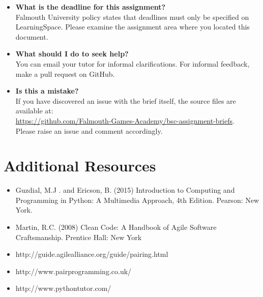 \documentclass{../fal_assignment}
\begin{document}
\begin{itemize}
	\item 	\textbf{What is the deadline for this assignment?} \\ 
    		Falmouth University policy states that deadlines must only be specified on LearningSpace. Please examine the assignment area where you located this document.
    		
	\item 	\textbf{What should I do to seek help?} \\ 
    		You can email your tutor for informal clarifications. For informal feedback, make a pull request on GitHub. 
    		
    	\item 	\textbf{Is this a mistake?} \\ 	
    		If you have discovered an issue with the brief itself, the source files are available at: \\
    		\url{https://github.com/Falmouth-Games-Academy/bsc-assignment-briefs}.\\
    		 Please raise an issue and comment accordingly.
\end{itemize}

\section*{Additional Resources}

\begin{itemize}
    \item Guzdial, M.J . and Ericson, B. (2015) Introduction to Computing and Programming in Python: A Multimedia Approach, 4th Edition. Pearson: New York.
    \item Martin, R.C. (2008) Clean Code: A Handbook of Agile Software Craftsmanship. Prentice Hall: New York
    \item http://guide.agilealliance.org/guide/pairing.html
    \item http://www.pairprogramming.co.uk/
    \item http://www.pythontutor.com/
\end{itemize}
\end{document}
